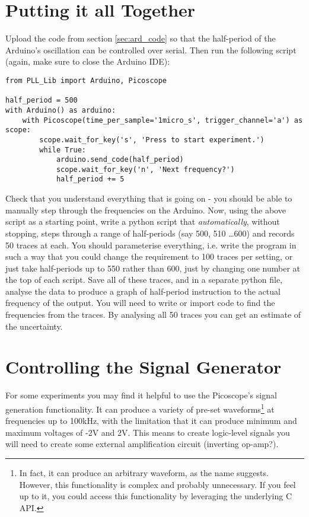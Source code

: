 \documentclass{article}
\begin{document}
\section{Putting it all Together}

Upload the code from section \ref{sec:ard_code} so that the half-period of the Arduino's oscillation can be controlled over serial. Then run the following script (again, make sure to close the Arduino IDE):
\begin{verbatim}
from PLL_Lib import Arduino, Picoscope

half_period = 500
with Arduino() as arduino:
    with Picoscope(time_per_sample='1micro_s', trigger_channel='a') as scope:
        scope.wait_for_key('s', 'Press to start experiment.')
        while True:
            arduino.send_code(half_period)
            scope.wait_for_key('n', 'Next frequency?')
            half_period += 5
\end{verbatim}
Check that you understand everything that is going on - you should be able to manually step through the frequencies on the Arduino. Now, using the above script as a starting point, write a python script that \textit{automatically}, without stopping, steps through a range of half-periods (say 500, 510 \ldots 600) and records 50 traces at each. You should parameterise everything, i.e. write the program in such a way that you could change the requirement to 100 traces per setting, or just take half-periods up to 550 rather than 600, just by changing one number at the top of each script. Save all of these traces, and in a separate python file, analyse the data to produce a graph of half-period instruction to the actual frequency of the output. You will need to write or import code to find the frequencies from the traces. By analysing all 50 traces you can get an estimate of the uncertainty.

\section{Controlling the Signal Generator}

For some experiments you may find it helpful to use the Picoscope's signal generation functionality. It can produce a variety of pre-set waveforms\footnote{In fact, it can produce an arbitrary waveform, as the name suggests. However, this functionality is complex and probably unnecessary. If you feel up to it, you could access this functionality by leveraging the underlying C API.} at frequencies up to 100kHz, with the limitation that it can produce minimum and maximum voltages of -2V and 2V. This means to create logic-level signals you will need to create some external amplification circuit (inverting op-amp?).
\end{document}
